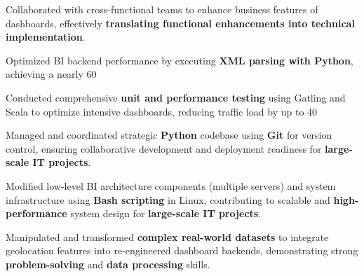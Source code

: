 \begin{onecolentry}
\begin{highlights}
                \item Collaborated with cross-functional teams to enhance business features of dashboards, effectively \textbf{translating functional enhancements into technical implementation}.
                \item Optimized BI backend performance by executing \textbf{XML parsing with Python}, achieving a nearly 60\\%
                \item Conducted comprehensive \textbf{unit and performance testing} using Gatling and Scala to optimize intensive dashboards, reducing traffic load by up to 40\\%
                \item Managed and coordinated strategic \textbf{Python} codebase using \textbf{Git} for version control, ensuring collaborative development and deployment readiness for \textbf{large-scale IT projects}.
                \item Modified low-level BI architecture components (multiple servers) and system infrastructure using \textbf{Bash scripting} in Linux, contributing to scalable and \textbf{high-performance} system design for \textbf{large-scale IT projects}.
                \item Manipulated and transformed \textbf{complex real-world datasets} to integrate geolocation features into re-engineered dashboard backends, demonstrating strong \textbf{problem-solving} and \textbf{data processing} skills.
            \end{highlights}
        \end{onecolentry}